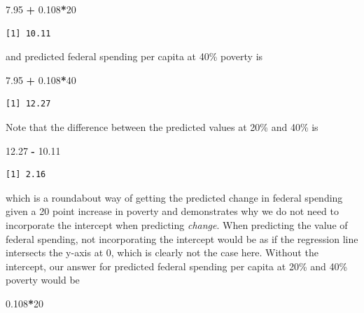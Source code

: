 \documentclass[
]{book}
\makeatletter
\newenvironment{Shaded}{\begin{snugshade}}{\end{snugshade}}
\newcommand{\DecValTok}[1]{\textcolor[rgb]{0.06,0.06,0.06}{#1}}
\newcommand{\FloatTok}[1]{\textcolor[rgb]{0.06,0.06,0.06}{#1}}
\newcommand{\SpecialCharTok}[1]{\textcolor[rgb]{0.43,0.43,0.43}{\textbf{#1}}}
\newenvironment{kframe}{%
\medskip{}
\setlength{\fboxsep}{.8em}
 \def\at@end@of@kframe{}%
 \ifinner\ifhmode%
  \def\at@end@of@kframe{\end{minipage}}%
  \begin{minipage}{\columnwidth}%
 \fi\fi%
 \def\FrameCommand##1{\hskip\@totalleftmargin \hskip-\fboxsep
 \colorbox{shadecolor}{##1}\hskip-\fboxsep
     \hskip-\linewidth \hskip-\@totalleftmargin \hskip\columnwidth}%
 \MakeFramed {\advance\hsize-\width
   \@totalleftmargin\z@ \linewidth\hsize
   \@setminipage}}%
 {\par\unskip\endMakeFramed%
 \at@end@of@kframe}
\renewenvironment{Shaded}{\begin{kframe}}{\end{kframe}}
\makeatother
\begin{document}
\begin{Shaded}
\begin{Highlighting}[]
\FloatTok{7.95} \SpecialCharTok{+} \FloatTok{0.108}\SpecialCharTok{*}\DecValTok{20}
\end{Highlighting}
\end{Shaded}

\begin{verbatim}
[1] 10.11
\end{verbatim}

and predicted federal spending per capita at 40\% poverty is

\begin{Shaded}
\begin{Highlighting}[]
\FloatTok{7.95} \SpecialCharTok{+} \FloatTok{0.108}\SpecialCharTok{*}\DecValTok{40}
\end{Highlighting}
\end{Shaded}

\begin{verbatim}
[1] 12.27
\end{verbatim}

Note that the difference between the predicted values at 20\% and 40\% is

\begin{Shaded}
\begin{Highlighting}[]
\FloatTok{12.27} \SpecialCharTok{{-}} \FloatTok{10.11}
\end{Highlighting}
\end{Shaded}

\begin{verbatim}
[1] 2.16
\end{verbatim}

which is a roundabout way of getting the predicted change in federal spending given a 20 point increase in poverty and demonstrates why we do not need to incorporate the intercept when predicting \emph{change}. When predicting the value of federal spending, not incorporating the intercept would be as if the regression line intersects the y-axis at 0, which is clearly not the case here. Without the intercept, our answer for predicted federal spending per capita at 20\% and 40\% poverty would be

\begin{Shaded}
\begin{Highlighting}[]
\FloatTok{0.108}\SpecialCharTok{*}\DecValTok{20}
\end{Highlighting}
\end{Shaded}
\end{document}
